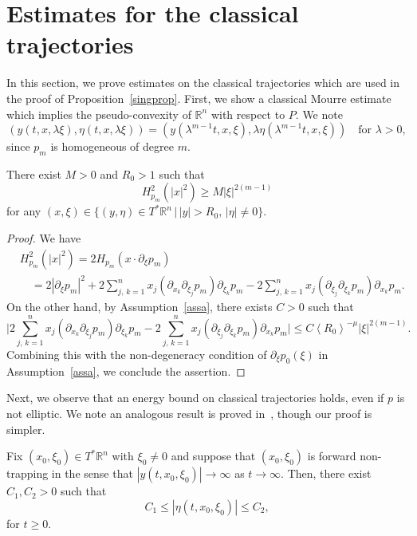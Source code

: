 \documentclass[AHL,Unicode,longabstracts,published]{cedram}
\renewcommand*\l{\lambda}
\newcommand*\m{\mu}
\newcommand*\x{\xi}
\newcommand*\y{\eta}
\newcommand*\re{\mathbb{R}}
\newcommand*\pa{\partial}
\newcommand{\jap}[1]{\left\langle #1 \right\rangle}
\newcommand{\biggabs}[1]{\biggl| #1 \biggr|}
\begin{document}
\appendix
\section{Estimates for the classical trajectories}\label{appa}
In this section, we prove estimates on the classical trajectories which are used in the proof of Proposition~\ref{singprop}. First, we show a classical Mourre estimate which implies the pseudo-convexity of $\re^n$ with respect to $P$. We note
\[
\left(y(t,x,\l\x),\y(t,x,\l\x)\right)=\left(y\left(\l^{m-1}t,x,\x\right),\l\y\left(\l^{m-1}t,x,\x\right)\right)\quad \text{for }\l>0,
\]
since $p_m$ is homogeneous of degree $m$.
\begin{lemm}\label{mourre}
There exist $M>0$ and $R_0>1$ such that
\[
H_{p_m}^2(|x|^2)\geq M|\x|^{2(m-1)}
\]
for any $(x,\x)\in \{(y,\y)\in T^*\re^{n}\,|\, |y|>R_0,\,|\y|\neq 0\}$.

\end{lemm}

\begin{proof}
We have
\begin{align*}
&H_{p_m}^2(|x|^2)=2H_{p_m}\left(x\cdot \pa_{\x}p_m\right)\\
&\quad =2|\pa_{\x}p_m|^2+2\sum_{j,\,k=1}^{n}x_j\left(\pa_{x_k}\pa_{\x_j}p_m\right)\pa_{\x_k}p_m- 2\sum_{j,\,k=1}^nx_j\left(\pa_{\x_j}\pa_{\x_k}p_m\right)\pa_{x_k}p_m.
\end{align*}
On the other hand, by Assumption~\ref{assa}, there exists $C>0$ such that
\[
\biggabs{2\sum_{j,\,k=1}^{n}x_j\left(\pa_{x_k}\pa_{\x_j}p_m\right)\pa_{\x_k}p_m- 2\sum_{j,\,k=1}^nx_j\left(\pa_{\x_j}\pa_{\x_k}p_m\right)\pa_{x_k}p_m}
\leq C\jap{R_0}^{-\m}|\x|^{2(m-1)}.
\]
Combining this with the non-degeneracy condition of $\pa_\x p_0(\x)$ in Assumption~\ref{assa}, we conclude the assertion.
\end{proof}


Next, we observe that an energy bound on classical trajectories holds, even if $p$ is not elliptic. We note an analogous result is proved in~\cite{KPRV}, though our proof is simpler.

\begin{lemm}\label{energy}
Fix $(x_0,\x_0)\in T^{*}\re^n$ with $\x_0\neq 0$ and suppose that $(x_0,\x_0)$ is forward non-trapping in the sense that $|y(t,x_0,\x_0)|\to \infty$ as $t\to \infty$. Then, there exist $C_1, C_2>0$ such that
\[
C_1\leq |\y(t, x_0, \x_0)|\leq C_2,
\]
for $t\geq 0$.
\end{lemm}
\end{document}
